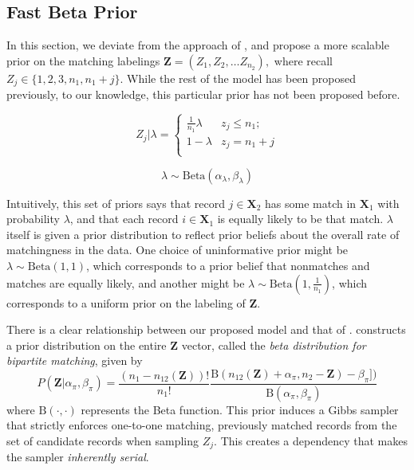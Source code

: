 \documentclass[12pt,letterpaper]{article}
\newcommand{\1}[1]{\mathbb{I}\!\left[#1\right]} %
\begin{document}
\hypertarget{fast-beta-prior}{%
	\subsection{Fast Beta Prior}
	\label{fast-beta-prior}}


In this section, we deviate from the approach of \cite{sadinle_bayesian_2017}, and propose a more scalable prior on the matching labelings $\bm{Z} = (Z_1, Z_2, \ldots Z_{n_2}),$ where recall $Z_j \in \{1,2, 3, n_1, n_1 + j\}.$ While the rest of the model has been proposed previously, to our knowledge, this particular prior has not been proposed before. 


\[Z_j | \lambda =
\begin{cases} 
	\frac{1}{n_1}\lambda  & z_j \leq n_1; \\
	1-\lambda &  z_j  = n_1 + j \\
\end{cases}\]

\[\lambda \sim \text{Beta}(\alpha_{\lambda}, \beta_{\lambda}) \] 


Intuitively, this set of priors says that record $j \in \bm{X}_2$ has some match in $\bm{X}_1$ with probability $\lambda$, and that each record $i \in \bm{X}_1$ is equally likely to be that match. $\lambda$ itself is given a prior distribution to reflect prior beliefs about the overall rate of matchingness in the data. One choice of uninformative prior might be \(\lambda \sim \text{Beta}(1, 1)\), which corresponds to a prior belief that nonmatches and matches are equally likely, and another might be \(\lambda \sim \text{Beta}\left(1, \frac{1}{n_1}\right)\), which corresponds to a uniform prior on the labeling of \(\mathbf{Z}\).

There is a clear relationship between our proposed model and that of \cite{sadinle_bayesian_2017}. 
\cite{sadinle_bayesian_2017} constructs a prior distribution on the entire \(\mathbf{Z}\) vector, called the \emph{beta distribution for bipartite matching}, given by
$$P(\mathbf{Z}|\alpha_{\pi}, \beta_{\pi}) = \frac{(n_1 - n_{12}(\mathbf{Z}))!}{n_1 !}\frac{\text{B}(n_{12}(\mathbf{Z}) + \alpha_{\pi}, n_2 - \mathbf{Z}) - \beta_{\pi}])}{\text{B}(\alpha_{\pi}, \beta_{\pi})}
$$
where $\text{B}(\cdot, \cdot)$ represents the Beta function. This prior induces a Gibbs sampler that strictly enforces one-to-one matching,  previously matched records from the set of candidate
records when sampling \(Z_j\). This creates a dependency that makes the
sampler \emph{inherently serial}. 
\end{document}
